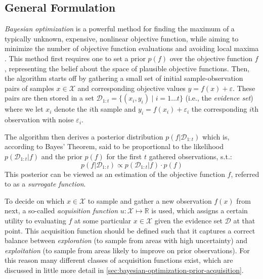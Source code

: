 \subsection{General Formulation}
\label{sec:bayesian-optimization-introduction}

\textit{Bayesian optimization} is a powerful method for finding the maximum of a typically unknown, expensive, nonlinear objective function, while aiming to minimize the number of objective function evaluations and avoiding local maxima \cite{Brochu2010}.
This method first requires one to set a prior $p(f)$ over the objective function $f$, representing the belief about the space of plausible objective functions.
Then, the algorithm starts off by gathering a small set of initial sample-observation pairs of samples $x \in \mathcal{X}$ and corresponding objective values $y = f(x) + \varepsilon$.
These pairs are then stored in a set $\mathcal{D}_{1:t} = \{(x_i, y_i) \mid i = 1 \ldots t\}$ (i.e., the \textit{evidence set}) where we let $x_i$ denote the $i$th sample and $y_i = f(x_i) + \varepsilon_i$ the corresponding $i$th observation with noise $\varepsilon_i$.

The algorithm then derives a posterior distribution $p(f \vert \mathcal{D}_{1:t})$ which is, according to Bayes' Theorem, said to be proportional to the likelihood $p(\mathcal{D}_{1:t} \vert f)$ and the prior $p(f)$ for the first $t$ gathered observations, s.t.:
\begin{equation}
	p(f \vert \mathcal{D}_{1:t}) \propto p(\mathcal{D}_{1:t} \vert f) \cdot p(f)
\end{equation}
This posterior can be viewed as an estimation of the objective function $f$, referred to as a \textit{surrogate function}.

To decide on which $x \in \mathcal{X}$ to sample and gather a new observation $f(x)$ from next, a so-called \textit{acquisition function} $u: \mathcal{X} \mapsto \mathbb{R}$ is used, which assigns a certain utility to evaluating $f$ at some particular $x \in \mathcal{X}$ given the evidence set $\mathcal{D}$ at that point.
This acquisition function should be defined such that it captures a correct balance between \textit{exploration} (to sample from areas with high uncertainty) and \textit{exploitation} (to sample from areas likely to improve on prior observations). For this reason many different classes of acquisition functions exist, which are discussed in little more detail in \autoref{sec:bayesian-optimization-prior-acquisition}.

